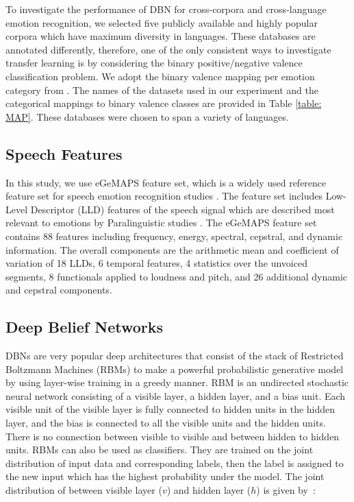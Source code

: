 \documentclass[a4paper]{article}
\begin{document}
To investigate the performance of DBN for cross-corpora and cross-language emotion recognition, we selected five publicly available and highly popular corpora which have maximum diversity in languages. These databases are annotated differently, therefore, one of the only consistent ways to investigate transfer learning is by considering the binary positive/negative valence classification problem. We adopt the binary valence mapping per emotion category from \cite{deng2013sparse,eyben2016geneva,schuller2010cross}.  
The names of the datasets used in our experiment and the categorical mappings to binary valence classes are provided in Table \ref{table: MAP}. These databases were chosen to span a variety of languages. %

\subsection{Speech Features}

In this study, we use eGeMAPS feature set, which is a widely used reference feature set for speech emotion recognition studies \cite{gideon2017progressive}. 
The feature set includes Low-Level Descriptor (LLD) features of the speech signal which are described most relevant to emotions by Paralinguistic studies \cite{eyben2016geneva}. The eGeMAPS feature set contains 88 features including frequency, energy, spectral, cepstral, and dynamic information. The overall components are the arithmetic mean and coefficient of variation of 18 LLDs, 6 temporal features, 4 statistics over the unvoiced segments, 8 functionals applied to loudness and pitch, and 26 additional dynamic and cepstral components.

\subsection{Deep Belief Networks}
DBNs are very popular deep architectures that consist of the stack of Restricted Boltzmann Machines (RBMs) to make a powerful probabilistic generative model by using layer-wise training in a greedy manner. RBM is an undirected stochastic neural network consisting of a visible layer, a hidden layer, and a bias unit. Each visible unit of the visible layer is fully connected to hidden units in the hidden layer, and the bias is connected to all the visible units and the hidden units. There is no connection between visible to visible and between hidden to hidden units. RBMs can also be used as classifiers. They are trained on the joint distribution of input data and corresponding labels, then the label is assigned to the new input which has the highest probability under the model. The joint distribution of between visible layer ($v$) and hidden layer ($h$) is given by~\cite{hinton2006fast}: 
\end{document}
